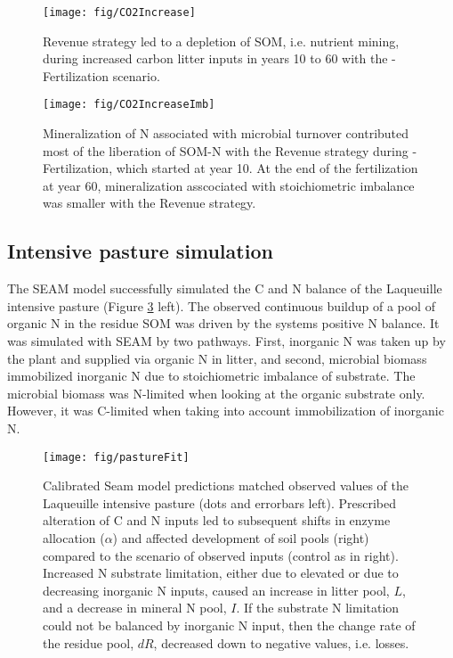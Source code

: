 \begin{figure}[t] \vspace*{2mm}
\begin{center}
\texttt{[image: fig/CO2Increase]}
\end{center}
\caption{
Revenue strategy led to a depletion of SOM, i.e.
nutrient mining, during increased carbon litter inputs
in years 10 to 60 with the -Fertilization scenario.
\label{fig:CO2Increase}}

\end{figure}
\begin{figure}[t] \vspace*{2mm}
\begin{center}
\texttt{[image: fig/CO2IncreaseImb]} 
\end{center}
\caption{
Mineralization of N associated with microbial turnover 
contributed most of the liberation of SOM-N with the Revenue strategy during
-Fertilization, which started at year 10.
At the end of the fertilization at year 60, mineralization asscociated 
with stoichiometric imbalance was smaller with the Revenue strategy.
\label{fig:CO2IncreaseImb}}
\end{figure}

\subsection{Intensive pasture simulation}
\label{sec:ResultsPasture}

The SEAM model successfully simulated the C and N balance of the Laqueuille
intensive pasture (Figure \ref{fig:pastureFit} left). The observed continuous
buildup of a pool of organic N in the residue SOM was driven by the systems
positive N balance. It was simulated with SEAM by two pathways. First, inorganic
N was taken up by the plant and supplied via organic N in litter, and second,
microbial biomass immobilized inorganic N due to stoichiometric imbalance of
substrate. The microbial biomass was N-limited when looking at the organic
substrate only. However, it was C-limited when taking into account
immobilization of inorganic N.

\begin{figure}[t] \vspace*{2mm}
\begin{center}
\texttt{[image: fig/pastureFit]} 
\end{center}
\caption{
Calibrated Seam model predictions matched observed values of the Laqueuille
intensive pasture (dots and errorbars left). Prescribed alteration of C and N
inputs led to subsequent shifts in enzyme allocation ($\alpha$) and affected
development of soil pools (right) compared to the scenario of observed inputs
(control as in right).
Increased N substrate limitation, either due to elevated  or due to
decreasing inorganic N inputs, caused an increase in litter pool, $L$, and a
decrease in mineral N pool, $I$. If the substrate N limitation could not be
balanced by inorganic N input, then the change rate of the residue pool, $dR$,
decreased down to negative values, i.e. losses.
\label{fig:pastureFit}
}
\end{figure}   

